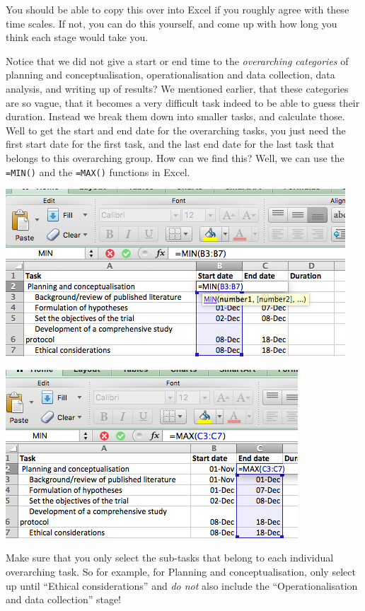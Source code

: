 \documentclass[
]{book}
\begin{document}
You should be able to copy this over into Excel if you roughly agree with these time scales. If not, you can do this yourself, and come up with how long you think each stage would take you.

Notice that we did not give a start or end time to the \emph{overarching categories} of planning and conceptualisation, operationalisation and data collection, data analysis, and writing up of results? We mentioned earlier, that these categories are so vague, that it becomes a very difficult task indeed to be able to guess their duration. Instead we break them down into smaller tasks, and calculate those. Well to get the start and end date for the overarching tasks, you just need the first start date for the first task, and the last end date for the last task that belongs to this overarching group. How can we find this? Well, we can use the \texttt{=MIN()} and the \texttt{=MAX()} functions in Excel.

\includegraphics{imgs/ gantt_min.png}

\includegraphics{imgs/gantt_max.png}

Make sure that you only select the sub-tasks that belong to each individual overarching task. So for example, for Planning and conceptualisation, only select up until ``Ethical considerations'' and \emph{do not} also include the ``Operationalisation and data collection'' stage!
\end{document}
